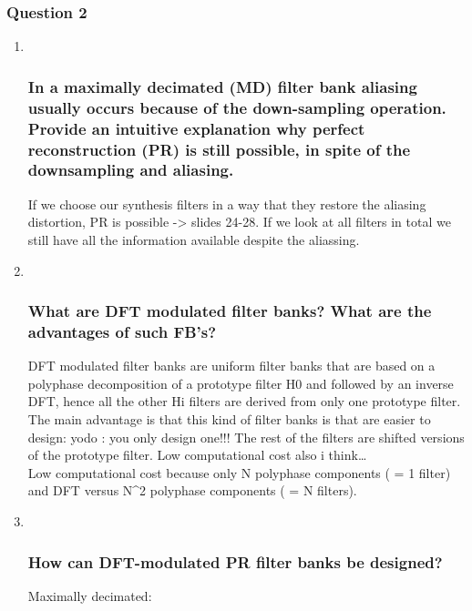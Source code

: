 \documentclass[
  a4paper,
  ,captions=tableheading
]{scrartcl}
\begin{document}
\subsubsection{Question 2}\label{question-2-4}

\begin{enumerate}
\def\labelenumi{\arabic{enumi}.}
\item ~
  \subsubsection{In a maximally decimated (MD) filter bank aliasing
  usually occurs because of the down-sampling operation. Provide an
  intuitive explanation why perfect reconstruction (PR) is still
  possible, in spite of the downsampling and
  aliasing.}\label{in-a-maximally-decimated-md-filter-bank-aliasing-usually-occurs-because-of-the-down-sampling-operation.-provide-an-intuitive-explanation-why-perfect-reconstruction-pr-is-still-possible-in-spite-of-the-downsampling-and-aliasing.}

  If we choose our synthesis filters in a way that they restore the
  aliasing distortion, PR is possible -\textgreater{} slides 24-28. If
  we look at all filters in total we still have all the information
  available despite the aliassing.
\item ~
  \subsubsection{What are DFT modulated filter banks? What are the
  advantages of such
  FB's?}\label{what-are-dft-modulated-filter-banks-what-are-the-advantages-of-such-fbs}

  DFT modulated filter banks are uniform filter banks that are based on
  a polyphase decomposition of a prototype filter H0 and followed by an
  inverse DFT, hence all the other Hi filters are derived from only one
  prototype filter. The main advantage is that this kind of filter banks
  is that are easier to design: yodo : you only design one!!! The rest
  of the filters are shifted versions of the prototype filter. Low
  computational cost also i think\ldots{}\\
  Low computational cost because only N polyphase components ( = 1
  filter) and DFT versus N\^{}2 polyphase components ( = N filters).
\item ~
  \subsubsection{How can DFT-modulated PR filter banks be
  designed?}\label{how-can-dft-modulated-pr-filter-banks-be-designed}

  Maximally decimated:\\
\end{enumerate}
\end{document}
